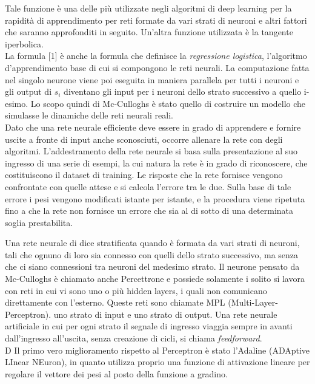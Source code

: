 Tale funzione è una delle più utilizzate negli algoritmi di deep learning per la rapidità di 
apprendimento per reti formate da vari strati di neuroni e altri fattori che saranno approfonditi in seguito. 
Un’altra funzione utilizzata è la tangente iperbolica.\\
La formula [1] è anche la formula che definisce la \emph{regressione logistica}, l’algoritmo d’apprendimento base di cui si compongono le
reti neurali.
La computazione fatta nel singolo neurone viene poi eseguita in maniera parallela per tutti 
i neuroni e gli output di \(s_i\) diventano gli input per i neuroni dello strato successivo a quello
 i-esimo. Lo scopo quindi di Mc-Culloghs è stato quello di costruire un modello che simulasse le dinamiche 
 delle reti neurali reali.\\
Dato che una rete neurale efficiente deve essere in grado di apprendere e fornire uscite a fronte di 
input anche sconosciuti, occorre allenare la rete con degli algoritmi. 
L’addestramento della rete neurale si basa sulla presentazione al suo ingresso di una serie di esempi,
 la cui natura la rete è in grado di riconoscere, che costituiscono il dataset di training. 
 Le risposte che la rete fornisce vengono confrontate con quelle attese e si calcola l’errore tra le due.
  Sulla base di tale errore i pesi vengono modificati istante per istante, e la procedura viene ripetuta
   fino a che la rete non fornisce un errore che sia al di sotto di una determinata soglia prestabilita.
     


Una rete neurale di dice stratificata quando è formata da vari strati di neuroni, 
tali che ognuno di loro sia connesso con quelli dello strato successivo, ma senza che ci 
siano connessioni tra neuroni del medesimo strato. 
Il neurone pensato da Mc-Culloghs è chiamato anche Percettrone e possiede solamente 
i solito si lavora con reti in cui vi sono uno o più hidden layers, 
i quali non comunicano direttamente con l’esterno. Queste reti sono chiamate MPL (Multi-Layer-Perceptron). 
uno strato di input e uno strato di output.
Una rete neurale artificiale in cui per ogni strato il segnale di ingresso viaggia
sempre in avanti dall’ingresso all’uscita, senza creazione di cicli, si chiama \emph{feedforward}. \\

D
Il primo vero miglioramento rispetto al Perceptron è stato l’Adaline (ADAptive LInear NEuron), 
in quanto utilizza proprio una funzione di attivazione lineare per regolare il vettore 
dei pesi al posto della funzione a gradino. \\


